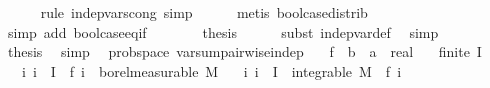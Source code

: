 \begin{isabellebody}
\ \ \ \ \isamarkupfalse%
\ {\isacharparenleft}{\kern0pt}rule\ indep{\isacharunderscore}{\kern0pt}vars{\isacharunderscore}{\kern0pt}cong{\isacharcomma}{\kern0pt}\ simp{\isacharparenright}{\kern0pt}\isanewline
\ \ \ \ \isamarkupfalse%
\ {\isacharparenleft}{\kern0pt}metis\ bool{\isachardot}{\kern0pt}case{\isacharunderscore}{\kern0pt}distrib{\isacharparenright}{\kern0pt}\isanewline
\ \ \ \ \isamarkupfalse%
\ {\isacharparenleft}{\kern0pt}simp\ add{\isacharcolon}{\kern0pt}\ bool{\isachardot}{\kern0pt}case{\isacharunderscore}{\kern0pt}eq{\isacharunderscore}{\kern0pt}if{\isacharparenright}{\kern0pt}\isanewline
\ \ \isamarkupfalse%
\ \isamarkupfalse%
\ {\isachardoublequoteopen}{\isachardot}{\kern0pt}{\isachardot}{\kern0pt}{\isachardot}{\kern0pt}\ {\isacharequal}{\kern0pt}\ {\isacharquery}{\kern0pt}thesis{\isachardoublequoteclose}\isanewline
\ \ \ \ \isamarkupfalse%
\ {\isacharparenleft}{\kern0pt}subst\ indep{\isacharunderscore}{\kern0pt}var{\isacharunderscore}{\kern0pt}def{\isacharparenright}{\kern0pt}\ \isamarkupfalse%
\ simp\isanewline
\ \ \isamarkupfalse%
\ \isamarkupfalse%
\ {\isacharquery}{\kern0pt}thesis\ \isamarkupfalse%
\ simp\isanewline
{}\isamarkupfalse%
%
\endisatagproof
{\isafoldproof}%
%
\isadelimproof
\isanewline
%
\endisadelimproof
\isanewline
{}\isamarkupfalse%
\ {\isacharparenleft}{\kern0pt}\ prob{\isacharunderscore}{\kern0pt}space{\isacharparenright}{\kern0pt}\ var{\isacharunderscore}{\kern0pt}sum{\isacharunderscore}{\kern0pt}pairwise{\isacharunderscore}{\kern0pt}indep{\isacharunderscore}{\kern0pt}{}{\isacharcolon}{\kern0pt}\isanewline
\ \ \ f\ {\isacharcolon}{\kern0pt}{\isacharcolon}{\kern0pt}\ {\isachardoublequoteopen}{\isacharprime}{\kern0pt}b\ {\isasymRightarrow}\ {\isacharprime}{\kern0pt}a\ {\isasymRightarrow}\ real{\isachardoublequoteclose}\isanewline
\ \ \ {\isachardoublequoteopen}finite\ I{\isachardoublequoteclose}\isanewline
\ \ \ {\isachardoublequoteopen}{\isasymAnd}i{\isachardot}{\kern0pt}\ i\ {\isasymin}\ I\ {\isasymLongrightarrow}\ f\ i\ {\isasymin}\ borel{\isacharunderscore}{\kern0pt}measurable\ M{\isachardoublequoteclose}\isanewline
\ \ \ {\isachardoublequoteopen}{\isasymAnd}i{\isachardot}{\kern0pt}\ i\ {\isasymin}\ I\ {\isasymLongrightarrow}\ integrable\ M\ {\isacharparenleft}{\kern0pt}{\isasymlambda}{\isasymomega}{\isachardot}{\kern0pt}\ f\ i\ {\isasymomega}{\isacharcircum}{\kern0pt}{}{\isacharparenright}{\kern0pt}{\isachardoublequoteclose}\isanewline

\end{isabellebody}
